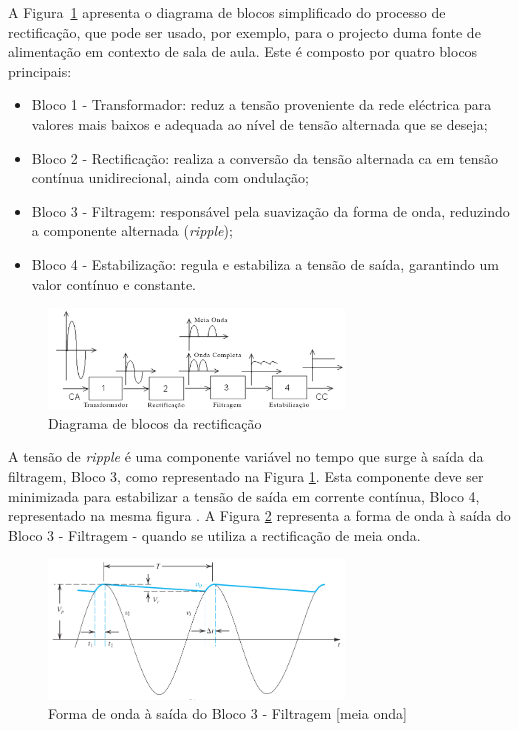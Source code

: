 A Figura~\ref{fig:blocosrectificacao} apresenta o diagrama de blocos simplificado do processo de rectificação, que pode ser usado, por exemplo, para o projecto duma fonte de alimentação em contexto de sala de aula. Este é composto por quatro blocos principais:

\begin{itemize}
    \item Bloco 1 - Transformador: reduz a tensão proveniente da rede eléctrica para valores mais baixos e adequada ao nível de tensão alternada que se deseja;
    \item Bloco 2 - Rectificação: realiza a conversão da tensão alternada \acrshort{ca} em tensão contínua unidirecional, ainda com ondulação;
    \item Bloco 3 - Filtragem: responsável pela suavização da forma de onda, reduzindo a componente alternada (\textit{ripple});
    \item Bloco 4 - Estabilização:  regula e estabiliza a tensão de saída, garantindo um valor contínuo e constante.
\end{itemize}

\begin{figure}[hbtp]
	\centering
	\includegraphics[width=0.7\textwidth]{figures/diagramablocosrectificacao.png}
	\caption{Diagrama de blocos da rectificação }
	\label{fig:blocosrectificacao}
\end{figure}

A tensão de \textit{ripple} é uma componente variável no tempo que surge à saída da filtragem, Bloco 3, como representado na Figura \ref{fig:blocosrectificacao}. Esta componente deve ser minimizada para estabilizar a tensão de saída em corrente contínua, Bloco 4, representado na mesma figura \cite{sedrasmith}. A Figura \ref{fig:sedraripple} representa a forma de onda à saída do Bloco 3 - Filtragem - quando se utiliza a rectificação de meia onda.
\begin{figure}[hbtp]
	\centering
	\includegraphics[width=0.7\textwidth]{figures/sedra_ripple.png}
	\caption{Forma de onda à saída do Bloco 3 - Filtragem [meia onda] \cite{sedrasmith}}
	\label{fig:sedraripple}
\end{figure}

